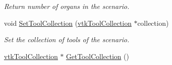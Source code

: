 \begin{DoxyCompactItemize}
\begin{DoxyCompactList}\small\item\em Return number of organs in the scenario. \item\end{DoxyCompactList}\item 
void \hyperlink{classvtkScenario_a50915d4f98502e2b99745b99e89d0522}{SetToolCollection} (\hyperlink{classvtkToolCollection}{vtkToolCollection} $\ast$collection)
\begin{DoxyCompactList}\small\item\em Set the collection of tools of the scenario. \item\end{DoxyCompactList}\item 
\hypertarget{classvtkScenario_aba9b4cf2efd6102addb5e5cde413b299}{
\hyperlink{classvtkToolCollection}{vtkToolCollection} $\ast$ \hyperlink{classvtkScenario_aba9b4cf2efd6102addb5e5cde413b299}{GetToolCollection} ()}
\label{classvtkScenario_aba9b4cf2efd6102addb5e5cde413b299}


\end{DoxyCompactItemize}
